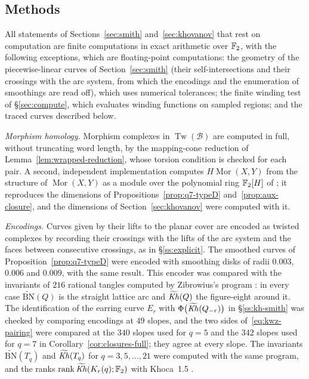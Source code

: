 \subsection{Methods}\label{ss:methods}
All statements of Sections~\ref{sec:smith} and~\ref{sec:khovanov} that rest on computation are finite
computations in exact arithmetic over $\mathbb{F}_2$, with the following exceptions, which are floating-point
computations: the geometry of the piecewise-linear curves of Section~\ref{sec:smith} (their self-intersections and
their crossings with the arc system, from which the encodings and the enumeration of smoothings are read off),
which uses numerical tolerances; the finite winding
test of \S\ref{sec:compute}, which evaluates winding functions on sampled regions; and the traced curves described
below.

\emph{Morphism homology.}  Morphism complexes in $\operatorname{Tw}(\mathcal B)$ are computed in
full, without truncating word length, by the mapping-cone reduction of
Lemma~\ref{lem:wrapped-reduction}, whose torsion condition is checked for each pair.  A second,
independent implementation computes $H\operatorname{Mor}(X,Y)$ from the structure of
$\operatorname{Mor}(X,Y)$ as a module over the polynomial ring $\mathbb{F}_2[H]$ of \cite{KWZ}; it
reproduces the dimensions of Propositions~\ref{prop:q7-typeD} and~\ref{prop:aux-closure}, and the
dimensions of Section~\ref{sec:khovanov} were computed with it.

\emph{Encodings.}  Curves given by their lifts to the planar cover are encoded as twisted complexes
by recording their crossings with the lifts of the arc system and the faces between consecutive
crossings, as in \S\ref{ss:explicit}.  The smoothed curves of Proposition~\ref{prop:q7-typeD} were encoded
with smoothing disks of radii $0.003$, $0.006$ and $0.009$, with the same result.  This encoder was compared with the invariants of $216$
rational tangles computed by Zibrowius's program \cite{Zibkht}: in every case
$\widetilde{\mathrm{BN}}(Q)$ is the straight lattice arc and $\widetilde{\mathit{Kh}}(Q)$ the figure-eight
around it.  The identification of the earring curve $E_r$ with $\Phi\bigl(\widetilde{\mathit{Kh}}(Q_{-r})\bigr)$ in
\S\ref{ss:kh-smith} was checked by comparing encodings at $49$ slopes, and the two sides
of~\eqref{eq:kwz-pairing} were compared at the $340$ slopes used for $q=5$ and the $342$ slopes used for $q=7$
in Corollary~\ref{cor:closures-full}; they agree at every slope.  The invariants $\widetilde{\mathrm{BN}}(T_q)$
and $\widetilde{\mathit{Kh}}(T_q)$ for $q=3,5,\dots,21$ were computed with the same program, and the ranks
$\operatorname{rank}\widetilde{\mathit{Kh}}(K_r(q);\mathbb{F}_2)$ with Khoca~1.5 \cite{Khoca}.


